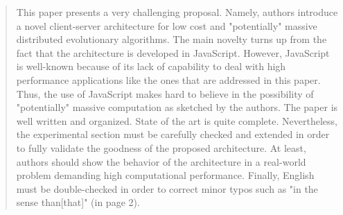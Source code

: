 \documentclass[preprint]{elsarticle}
\begin{document}
\begin{quote}
This paper presents a very challenging proposal. Namely, authors introduce a novel client-server
architecture for low cost and "potentially" massive distributed evolutionary algorithms. The main novelty
turns up from the fact that the architecture is developed in JavaScript.
However, JavaScript is well-known because of its lack of capability to deal with high performance
applications like the ones that are addressed in this paper. Thus, the use of JavaScript makes hard to
believe in the possibility of "potentially" massive computation as sketched by the authors.
The paper is well written and organized. State of the art is quite complete. Nevertheless, the experimental
section must be carefully checked and extended in order to fully validate the goodness of the proposed
architecture. At least, authors should show the behavior of the architecture in a real-world problem
demanding high computational performance.
Finally, English must be double-checked in order to correct minor typos such as "in the sense than[that]"
(in page 2).
\end{quote}
\end{document}
